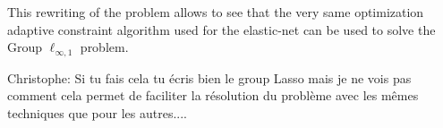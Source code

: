 This  rewriting  of the  problem  allows to  see  that  the very  same
optimization adaptive  constraint algorithm  used for the  elastic-net
can be used to solve the Group  $\ell_{\infty,1}$ problem.


{

Christophe: Si  tu fais cela tu écris  bien le group Lasso  mais je ne
vois pas comment cela permet de faciliter la résolution du problème avec les mêmes
techniques que pour les autres....
}

{\color{blue}{Christophe:  une version group  oscar devrait  donner de
    meilleurs résultats}}
\fi